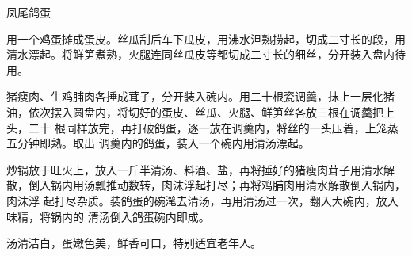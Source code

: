 %
%
%
%
%
%
%
\begin{recipe}{凤尾鸽蛋}

\ingredients


\preparation

\step 用一个鸡蛋摊成蛋皮。丝瓜刮后车下瓜皮，用沸水泹熟捞起，切成二寸长的段，用
清水漂起。将鲜笋煮熟，火腿连同丝瓜皮等都切成二寸长的细丝，分开装入盘内待用。

\step 猪瘦肉、生鸡脯肉各捶成茸子，分开装入碗内。用二十根瓷调羹，抹上一层化猪
油，依次摆入圆盘内，将切好的蛋皮、丝瓜、火腿、鲜笋丝各放三根在调羹把上头，二十
根同样放完，再打破鸽蛋，逐一放在调羹内，将丝的一头压着，上笼蒸五分钟即熟。取出
调羹内的鸽蛋，装入一个碗内用清汤漂起。

\step 炒锅放于旺火上，放入一斤半清汤、料酒、盐，再将捶好的猪瘦肉茸子用清水解
散，倒入锅内用汤瓢推动数转，肉沫浮起打尽；再将鸡脯肉用清水解散倒入锅内，肉沫浮
起打尽杂质。装鸽蛋的碗滗去清汤，再用清汤过一次，翻入大碗内，放入味精，将锅内的
清汤倒入鸽蛋碗内即成。

\features

汤清洁白，蛋嫩色美，鲜香可口，特别适宜老年人。

\end{recipe}

